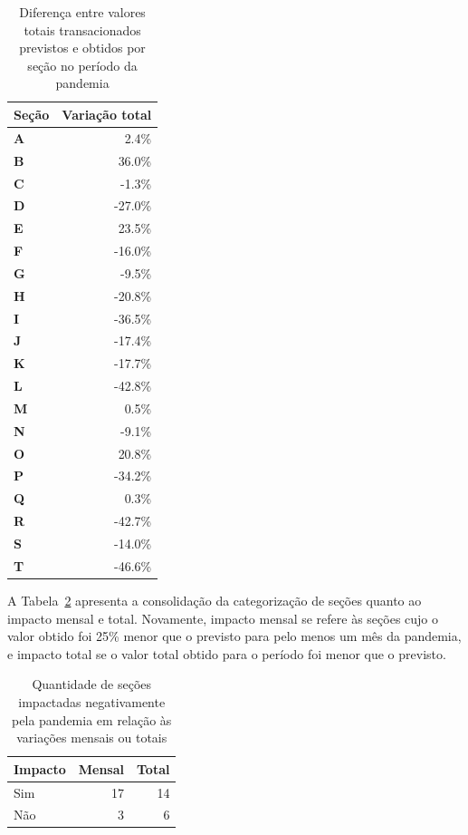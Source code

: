 \begin{table}[htb]
\centering
\caption{Diferença entre valores totais transacionados previstos e obtidos por seção no período da pandemia}
\label{tab:pandemia:variacao-total-por-secao}
    \begin{tabular}{l|r}
        \toprule
        \textbf{Seção} & Variação total \\
        \midrule
        \textbf{A} &   2.4\% \\
        \textbf{B} &  36.0\% \\
        \textbf{C} &  -1.3\% \\
        \textbf{D} & -27.0\% \\
        \textbf{E} &  23.5\% \\
        \textbf{F} & -16.0\% \\
        \textbf{G} &  -9.5\% \\
        \textbf{H} & -20.8\% \\
        \textbf{I} & -36.5\% \\
        \textbf{J} & -17.4\% \\
        \textbf{K} & -17.7\% \\
        \textbf{L} & -42.8\% \\
        \textbf{M} &   0.5\% \\
        \textbf{N} &  -9.1\% \\
        \textbf{O} &  20.8\% \\
        \textbf{P} & -34.2\% \\
        \textbf{Q} &   0.3\% \\
        \textbf{R} & -42.7\% \\
        \textbf{S} & -14.0\% \\
        \textbf{T} & -46.6\% \\
        \bottomrule
    \end{tabular}
\fdadospesquisa
\end{table}

A Tabela~\ref{tab:pandemia:impacto-por-secao} apresenta a consolidação da categorização de seções quanto ao impacto mensal e total. Novamente, impacto mensal se refere às seções cujo o valor obtido foi 25\% menor que o previsto para pelo menos um mês da pandemia, e impacto total se o valor total obtido para o período foi menor que o previsto.

\begin{table}[htb]
\centering
\caption{Quantidade de seções impactadas negativamente pela pandemia em relação às variações mensais ou totais}
\label{tab:pandemia:impacto-por-secao}
    \begin{tabular}{l|r|r}
        \toprule
        Impacto & Mensal & Total \\
        \midrule
        Sim & 17 & 14 \\
        Não &  3 &  6 \\
        \bottomrule
    \end{tabular}
\fdadospesquisa
\end{table}

